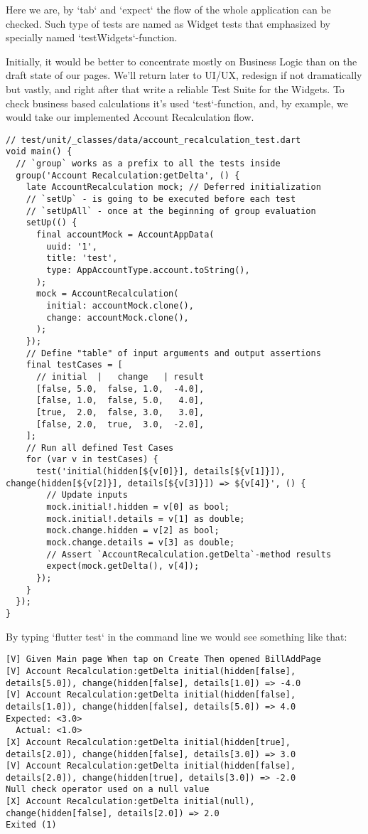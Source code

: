 Here we are, by `tab` and `expect` the flow of the whole application can be checked. Such type of tests are named as 
Widget tests that emphasized by specially named `testWidgets`-function.

Initially, it would be better to concentrate mostly on Business Logic than on the draft state of our pages. We'll 
return later to UI/UX, redesign if not dramatically but vastly, and right after that write a reliable 
Test Suite for the Widgets. To check business based calculations it's used `test`-function, and, by example, we would
take our implemented Account Recalculation flow.

\begin{lstlisting}
// test/unit/_classes/data/account_recalculation_test.dart 
void main() {
  // `group` works as a prefix to all the tests inside
  group('Account Recalculation:getDelta', () {
    late AccountRecalculation mock; // Deferred initialization 
    // `setUp` - is going to be executed before each test
    // `setUpAll` - once at the beginning of group evaluation
    setUp(() {
      final accountMock = AccountAppData(
        uuid: '1',
        title: 'test',
        type: AppAccountType.account.toString(),
      );
      mock = AccountRecalculation(
        initial: accountMock.clone(),
        change: accountMock.clone(),
      );
    });
    // Define "table" of input arguments and output assertions
    final testCases = [
      // initial  |   change   | result
      [false, 5.0,  false, 1.0,  -4.0],
      [false, 1.0,  false, 5.0,   4.0],
      [true,  2.0,  false, 3.0,   3.0],
      [false, 2.0,  true,  3.0,  -2.0],
    ];
    // Run all defined Test Cases
    for (var v in testCases) {
      test('initial(hidden[${v[0]}], details[${v[1]}]), change(hidden[${v[2]}], details[${v[3]}]) => ${v[4]}', () {
        // Update inputs
        mock.initial!.hidden = v[0] as bool;
        mock.initial!.details = v[1] as double;
        mock.change.hidden = v[2] as bool;
        mock.change.details = v[3] as double;
        // Assert `AccountRecalculation.getDelta`-method results
        expect(mock.getDelta(), v[4]); 
      });
    }
  });
}
\end{lstlisting}

By typing `flutter test` in the command line we would see something like that:

\begin{lstlisting}
[V] Given Main page When tap on Create Then opened BillAddPage
[V] Account Recalculation:getDelta initial(hidden[false], details[5.0]), change(hidden[false], details[1.0]) => -4.0
[V] Account Recalculation:getDelta initial(hidden[false], details[1.0]), change(hidden[false], details[5.0]) => 4.0
Expected: <3.0>
  Actual: <1.0>
[X] Account Recalculation:getDelta initial(hidden[true], details[2.0]), change(hidden[false], details[3.0]) => 3.0
[V] Account Recalculation:getDelta initial(hidden[false], details[2.0]), change(hidden[true], details[3.0]) => -2.0
Null check operator used on a null value
[X] Account Recalculation:getDelta initial(null), change(hidden[false], details[2.0]) => 2.0
Exited (1)
\end{lstlisting}

